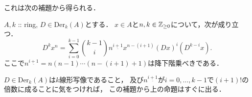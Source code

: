 \documentclass[a4paper]{jsarticle}
\newcommand{\Der}{\mathrm{Der}}
\begin{document}
これは次の補題から得られる．
\begin{Lemma}
    $A, k$ :: ring, $D \in \Der_k(A)$とする．
    $x \in A$と$n,k \in \mathbb{Z}_{\geq 0}$について，次が成り立つ．
    \[ D^k x^n=\sum_{i=0}^{k-1} \binom{k-1}{i} n^{\underline{i+1}} x^{n-(i+1)} (Dx)^i (D^{k-i} x). \]
    ここで$n^{\underline{i+1}}=n(n-1)\cdots(n-(i+1)+1)$は降下階乗べきである．
\end{Lemma}
$D \in \Der_k(A)$は$k$線形写像であること，
及び$n^{\underline{i+1}}$が$i=0,\dots,k-1$で$(i+1)!$の倍数に成ることに気をつければ，
この補題から上の命題はすぐに出る．
\end{document}
